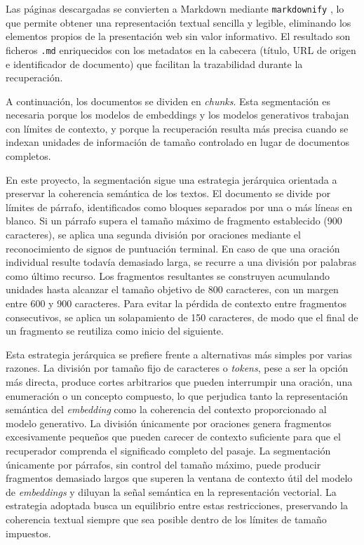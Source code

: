 Las páginas descargadas se convierten a Markdown mediante \texttt{markdownify} \cite{markdownify}, lo que permite obtener una representación textual sencilla y legible, eliminando los elementos propios de la presentación web sin valor informativo. 
El resultado son ficheros \texttt{.md} enriquecidos con los metadatos en la cabecera (título, URL de origen e identificador de documento) que facilitan la trazabilidad durante la recuperación.

A continuación, los documentos se dividen en \textit{chunks}. 
Esta segmentación es necesaria porque los modelos de embeddings y los modelos generativos trabajan con límites de contexto, y porque la recuperación resulta más precisa cuando se indexan unidades de información de tamaño controlado en lugar de documentos completos.

En este proyecto, la segmentación sigue una estrategia jerárquica orientada a preservar la coherencia semántica de los textos.
El documento se divide por límites de párrafo, identificados como bloques separados por una o más líneas en blanco.
Si un párrafo supera el tamaño máximo de fragmento establecido (900 caracteres), se aplica una segunda división por oraciones mediante el reconocimiento de signos de puntuación terminal.
En caso de que una oración individual resulte todavía demasiado larga, se recurre a una división por palabras como último recurso.
Los fragmentos resultantes se construyen acumulando unidades hasta alcanzar el tamaño objetivo de 800 caracteres, con un margen entre 600 y 900 caracteres.
Para evitar la pérdida de contexto entre fragmentos consecutivos, se aplica un solapamiento de 150 caracteres, de modo que el final de un fragmento se reutiliza como inicio del siguiente.

Esta estrategia jerárquica se prefiere frente a alternativas más simples por varias razones.
La división por tamaño fijo de caracteres o \textit{tokens}, pese a ser la opción más directa, produce cortes arbitrarios que pueden interrumpir una oración, una enumeración o un concepto compuesto, lo que perjudica tanto la representación semántica del \textit{embedding} como la coherencia del contexto proporcionado al modelo generativo.
La división únicamente por oraciones genera fragmentos excesivamente pequeños que pueden carecer de contexto suficiente para que el recuperador comprenda el significado completo del pasaje.
La segmentación únicamente por párrafos, sin control del tamaño máximo, puede producir fragmentos demasiado largos que superen la ventana de contexto útil del modelo de \textit{embeddings} y diluyan la señal semántica en la representación vectorial.
La estrategia adoptada busca un equilibrio entre estas restricciones, preservando la coherencia textual siempre que sea posible dentro de los límites de tamaño impuestos.

